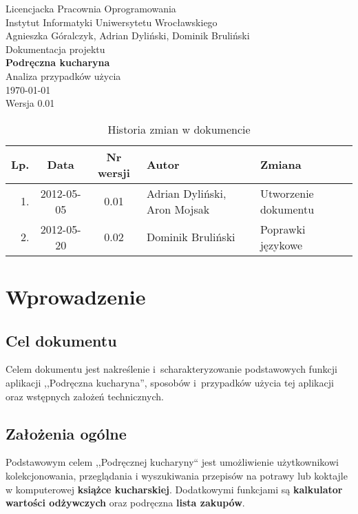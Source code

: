 \documentclass[12pt,leqno, twoside]{mwart}
\begin{document}
\thispagestyle{empty}
\begin{center}
Licencjacka Pracownia Oprogramowania \\ Instytut
Informatyki Uniwersytetu Wrocławskiego \\
\vspace{4cm}
\Large Agnieszka Góralczyk, Adrian Dyliński, Dominik Bruliński \\
\vspace{0.5cm}
\huge Dokumentacja projektu\\ \textbf{Podręczna kucharyna}\\ \Large Analiza przypadków użycia\\
\vspace{1cm}
\normalsize \today \\
\vspace{2cm}
\normalsize Wersja 0.01
\end{center}

\newpage


\begin{table}
	\centering
	\caption{Historia zmian w dokumencie}
		\begin{tabular}{|r|c|c|l|l|}
		\hline
		Lp. & Data       & Nr wersji & Autor               & Zmiana \\ \hline
		1.   & 2012-05-05 & 0.01 & Adrian Dyliński, Aron Mojsak & Utworzenie dokumentu \\ \hline
		2.  & 2012-05-20 & 0.02 & Dominik Bruliński & Poprawki językowe \\ \hline
		\end{tabular}
\end{table}

\newpage

\tableofcontents
\newpage

\section{Wprowadzenie}
  \subsection{Cel dokumentu}
  Celem dokumentu jest nakreślenie i~scharakteryzowanie podstawowych funkcji aplikacji ,,Podręczna kucharyna'', sposobów i~przypadków użycia tej aplikacji oraz wstępnych założeń technicznych.
  \subsection{Założenia ogólne}
  Podstawowym celem ,,Podręcznej kucharyny`` jest umożliwienie użytkownikowi kolekcjonowania, przeglądania i wyszukiwania przepisów na potrawy lub koktajle w komputerowej \textbf{książce kucharskiej}. Dodatkowymi funkcjami są \textbf{kalkulator wartości odżywczych} oraz podręczna \textbf{lista zakupów}.
\end{document}
